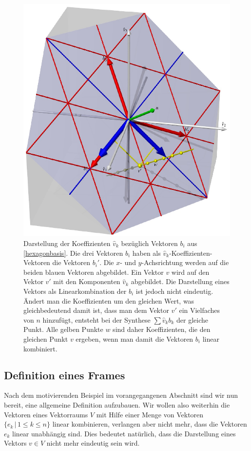 \begin{figure}
\centering
\includegraphics{chapters/1-geometrie/images/tri.pdf}
\caption{Darstellung der Koeffizienten $\hat{v}_k$ bezüglich Vektoren $b_i$
aus \eqref{hexagonbasis}.
Die drei Vektoren $b_i$ haben als $\hat{v}_k$-Koeffizienten-Vektoren
die Vektoren $b_i'$.
Die $x$- und $y$-Achsrichtung werden auf die beiden blauen Vektoren
abgebildet.
Ein Vektor $v$ wird auf den Vektor $v'$ mit den Komponenten
$\hat{v}_k$ abgebildet.
Die Darstellung eines Vektors als Linearkombination der $b_i$ ist
jedoch nicht eindeutig.
Ändert man die Koeffizienten um den gleichen Wert, was gleichbedeutend damit
ist, dass man dem Vektor $v'$ ein Vielfaches von $n$ hinzufügt, entsteht
bei der Synthese $\sum \hat{v}_k b_k$ der gleiche Punkt.
Alle gelben Punkte $w$ sind daher Koeffizienten, die den gleichen Punkt $v$
ergeben, wenn man damit die Vektoren $b_i$ linear kombiniert.
\label{3dbasisbild}}
\end{figure}

%
%
\subsection{Definition eines Frames}
Nach dem motivierenden Beispiel im vorangegangenen Abschnitt sind wir nun
bereit, eine allgemeine Definition aufzubauen.
Wir wollen also weiterhin die Vektoren eines Vektorraums $V$ mit Hilfe
einer Menge von Vektoren $\{e_k\,|\,1\le k\le n\}$ linear kombinieren,
verlangen aber nicht mehr, dass die Vektoren $e_k$ linear unabhängig sind.
Dies bedeutet natürlich, dass die Darstellung eines Vektors $v\in V$
nicht mehr eindeutig sein wird.

